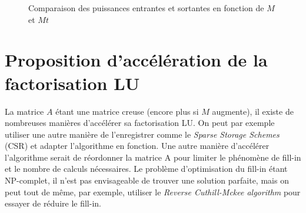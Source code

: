 \documentclass[11pt]{article}
\begin{document}
\begin{figure}[H]


    \caption{Comparaison des puissances entrantes et sortantes en fonction de $M$ et $Mt$ }
    \label{fig:example}
    
\end{figure}

\section{Proposition d'accélération de la factorisation LU}

La matrice $A$ étant une matrice creuse (encore plus si $M$ augmente), il existe de nombreuses manières d'accélérer sa factorisation LU. On peut par exemple utiliser une autre manière de l'enregistrer comme le \textit{Sparse Storage Schemes} (CSR) et adapter l'algorithme en fonction. Une autre manière d'accélérer l'algorithme serait de réordonner la matrice A pour limiter le phénomène de fill-in et le nombre de calculs nécessaires. Le problème d'optimisation du fill-in étant NP-complet, il n'est pas envisageable de trouver une solution parfaite, mais on peut tout de même, par exemple, utiliser le \textit{Reverse Cuthill-Mckee algorithm} pour essayer de réduire le fill-in.
\end{document}
